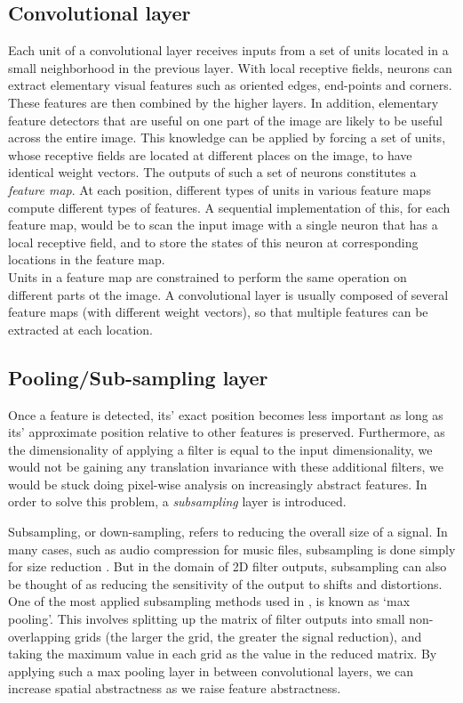 \subsection{Convolutional layer} 

 Each unit of a convolutional layer receives inputs from a set of units located in a small neighborhood in the previous layer. With local receptive fields, neurons can extract elementary visual features such as oriented edges, end-points and corners. These features are then combined by the higher layers\cite{lecun2010convolutional}. In addition, elementary feature detectors that are useful on one part of the image are likely to be useful across the entire image. This knowledge can be applied by forcing a set of units, whose receptive fields are located at different places on the image, to have identical weight vectors\cite{williams1986learning}. The outputs of such a set of neurons constitutes a \textit{feature map}. At each position, different types of units in various feature maps compute different types of features. A sequential implementation of this, for each feature map, would be to scan the input image with a single neuron that has a local receptive field, and to store the states of this neuron at corresponding locations in the feature map\cite{lecun2010convolutional}. \\
\indent Units in a feature map are constrained to perform the same operation on different parts ot the image. A convolutional layer is usually composed of several feature maps (with different weight vectors), so that multiple features can be extracted at each location. 

\subsection{Pooling/Sub-sampling layer}
Once a feature is detected, its' exact position becomes less important as long as its' approximate position relative to other features is preserved. Furthermore, as the dimensionality of applying a filter is equal to the input dimensionality, we would not be gaining any translation invariance with these additional filters, we would be stuck doing pixel-wise analysis on increasingly abstract features. In order to solve this problem, a \textit{subsampling} layer is introduced.

 Subsampling, or down-sampling, refers to reducing the overall size of a signal. In many cases, such as audio compression for music files, subsampling is done simply for size reduction \cite{sub}. But in the domain of 2D filter outputs, subsampling  can also be thought of as reducing the sensitivity of the output to shifts and distortions. One of the most applied subsampling methods used in \cite{lecun1995comparison}, is known as `max pooling'. This involves splitting up the matrix of filter outputs into small non-overlapping grids (the larger the grid, the greater the signal reduction), and taking the maximum value in each grid as the value in the reduced matrix. By applying such a max pooling layer in between convolutional layers, we can increase spatial abstractness as we raise feature abstractness\cite{sub}.

